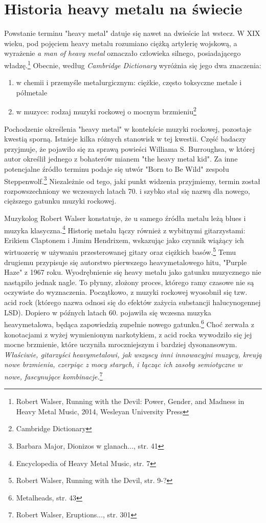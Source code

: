 \documentclass[12pt, a4paper, titlepage]{report}
\begin{document}
\section{Historia heavy metalu na świecie}
Powstanie terminu "heavy metal" datuje się nawet na dwieście lat wstecz. W XIX wieku, pod pojęciem heavy metalu rozumiano ciężką artylerię wojskową, a wyrażenie \textit{a man of heavy metal} oznaczało człowieka silnego, posiadającego władzę.\footnote{Robert Walser, Running with the Devil: Power, Gender, and Madness in Heavy Metal Music, 2014, Wesleyan University Press}  Obecnie, według \textit{Cambridge Dictionary} wyróżnia się jego dwa znaczenia: 
\begin{enumerate}
\item w chemii i przemyśle metalurgicznym: ciężkie, często toksyczne metale  i półmetale
\item w muzyce: rodzaj muzyki rockowej o mocnym brzmieniu\footnote{Cambridge Dictionary}
\end{enumerate}
Pochodzenie określenia "heavy metal" w kontekście muzyki rockowej, pozostaje kwestią sporną. Istnieje kilka różnych stanowisk w tej kwestii. Część badaczy przyjmuje, że pojawiło się za sprawą powieści Williama S. Burroughsa, w której autor określił jednego z bohaterów mianem "the heavy metal kid". Za inne potencjalne źródło terminu podaje się utwór "Born to Be Wild" zespołu Steppenwolf.\footnote{Barbara Major, Dionizos w glanach..., str. 41} Niezależnie od tego, jaki punkt widzenia przyjmiemy, termin został rozpowszechniony we wczesnych latach 70. i szybko stał się nazwą dla nowego, cięższego gatunku muzyki rockowej. 

 
Muzykolog Robert Walser konstatuje, że u samego źródła metalu leżą blues i muzyka klasyczna.\footnote{Encyclopedia of Heavy Metal Music, str. 7} %
Historię metalu łączy również z wybitnymi gitarzystami: Erikiem Claptonem i Jimim Hendrixem, wskazując jako czynnik wiążący ich wirtuozerię w używaniu przesterowanej gitary oraz ciężkich basów.\footnote{Robert Walser, Running with the Devil, str. 9-?} Temu drugiemu przypisuje się autorstwo pierwszego heavymetalowego hitu, "Purple Haze" z 1967 roku. Wyodrębnienie się heavy metalu jako gatunku muzycznego nie nastąpiło jednak nagle. To płynny, złożony proces, którego ramy czasowe nie są oczywiste do wyznaczenia. Początkowo, z muzyki rockowej wyosobnił się tzw. acid rock (którego nazwa odnosi się do efektów zażycia substancji halucynogennej LSD). Dopiero w późnych latach 60. pojawiła się wczesna muzyka heavymetalowa, będąca zapowiedzią zupełnie nowego gatunku.\footnote{Metalheads, str. 43} Choć zerwała z konotacjami z wyżej wymienionym narkotykiem, z acid rocka wywodziło się jej mocne brzmienie, które uczyniła mroczniejszym i bardziej dysonansowym. \textit{Właściwie, gitarzyści heavymetalowi, jak wszyscy inni innowacyjni muzycy, kreują nowe brzmienia, czerpiąc z mocy starych, i łącząc ich zasoby semiotyczne w nowe, fascynujące kombinacje.}\footnote{Robert Walser, Eruptions..., str. 301} 
\end{document}
